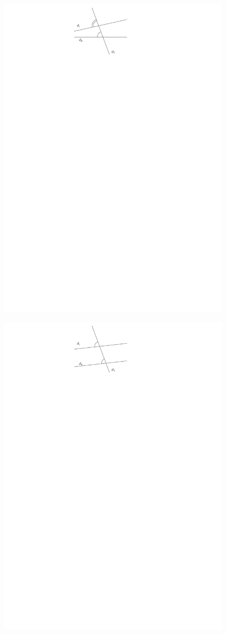 \documentclass[12pt]{article}
\begin{document}
\begin{multicols}{2}
  \begin{figure}[H]
    \centering
    \includegraphics[width=0.8\linewidth]{5x10-angles/sources/corres-1.pdf}
  \end{figure}
  \begin{figure}[H]
    \centering
    \includegraphics[width=0.8\linewidth]{5x10-angles/sources/corres-2.pdf}
  \end{figure}
\end{multicols}
\end{document}
